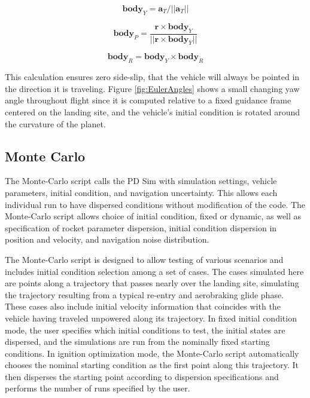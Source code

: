 \begin{equation}
\label{eqn:body_Y}
\bm{body}_Y = \bm{a}_T/||\bm{a}_T||
\end{equation}

\begin{equation}
\label{eqn:body_P}
\bm{body}_P = \frac{\bm{r} \times \bm{body}_Y}{||\bm{r} \times \bm{body}_Y||}
\end{equation}

\begin{equation}
\label{eqn:body_R}
\bm{body}_R = \bm{body}_Y \times \bm{body}_R
\end{equation}

This calculation ensures zero side-slip, that the vehicle will always be pointed in the direction it is traveling. Figure \ref{fig:EulerAngles} shows a small changing yaw angle throughout flight since it is computed relative to a fixed guidance frame centered on the landing site, and the vehicle's initial condition is rotated around the curvature of the planet. 

\subsection{Monte Carlo}
The Monte-Carlo script calls the PD Sim with simulation settings, vehicle parameters, initial condition, and navigation uncertainty. This allows each individual run to have dispersed conditions without modification of the code. The Monte-Carlo script allows choice of initial condition, fixed or dynamic, as well as specification of rocket parameter dispersion, initial condition dispersion in position and velocity, and navigation noise distribution.

The Monte-Carlo script is designed to allow testing of various scenarios and includes initial condition selection among a set of cases. The cases simulated here are points along a trajectory that passes nearly over the landing site, simulating the trajectory resulting from a typical re-entry and aerobraking glide phase. These cases also include initial velocity information that coincides with the vehicle having traveled unpowered along its trajectory. In fixed initial condition mode, the user specifies which initial conditions to test, the initial states are dispersed, and the simulations are run from the nominally fixed starting conditions. In ignition optimization mode, the Monte-Carlo script automatically chooses the nominal starting condition as the first point along this trajectory. It then disperses the starting point according to dispersion specifications and performs the number of runs specified by the user.

